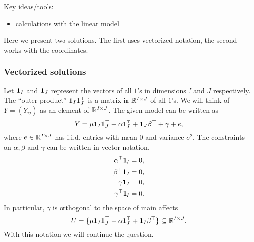 Key ideas/tools:
\begin{itemize}
\item calculations with the linear model
\end{itemize}

Here we present two solutions. The first uses vectorized notation, the second works with the coordinates. 
 
\subsubsection*{Vectorized solutions}

Let $\mathbf 1_I$ and $\mathbf 1_J$ represent the vectors of all $1$'s in dimensions $I$ and $J$ respectively. The ``outer product'' $\mathbf 1_I\mathbf 1_J^\top $ is a matrix in $\mathbb{R}^{I \times J}$ of all $1$'s. We will think of $Y = (Y_{ij})$ as an element of $\mathbb{R}^{I \times J}$. The given model can be written as 
\[Y = \mu \mathbf 1_I \mathbf 1_J^\top  + \alpha \mathbf 1_J^\top  + \mathbf 1_J \beta^\top  + \gamma + e, \]
where $e \in \mathbb{R}^{I \times J}$ has i.i.d. entries with mean 0 and variance $\sigma^2$. The constraints on $\alpha,\beta$ and $\gamma$ can be written in vector notation,
\begin{align*}
	\alpha^\top  \mathbf 1_I&=0,\\
	\beta^\top  \mathbf 1_J&=0,\\
	\gamma \mathbf 1_J &= 0,\\
	\gamma^\top  \mathbf 1_I &=0.
\end{align*}
In particular, $\gamma$ is orthogonal to the space of main affects 
\begin{equation}\label{eq:subspace}U = \{\mu\mathbf 1_I\mathbf 1_J^\top  + \alpha \mathbf 1_J^\top  +\mathbf 1_I\beta^\top  \} \subseteq \mathbb{R}^{I \times J}. \end{equation}
With this notation we will continue the question.
